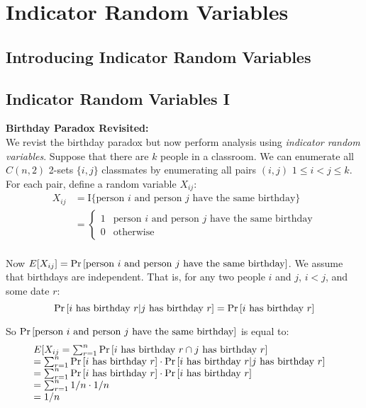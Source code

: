 \chapter{Indicator Random Variables}



\section{Introducing Indicator Random Variables}


\section{Indicator Random Variables I}



\begin{example}
\textbf{Birthday Paradox Revisited:}\\
We revist the birthday paradox but now perform analysis using \textit{indicator random variables}. 
Suppose that there are $k$ people in a classroom. We can enumerate all $C(n,2)$ 2-sets $\{i,j\}$ 
classmates by enumerating all pairs $(i,j)$ $1 \leqslant i < j \leqslant k$. 
For each pair, define a random variable $X_{ij}$:
\[ 
\begin{array}{ll}
 X_{ij} &= \text{I}\{\text{person } i \text{ and person } j \text{ have the same birthday}\}  \\
        &= \left\{  \begin{array}{ll} 1 & \text{person } i \text{ and person } j \text{ have the same birthday}
      \\ 0 & \text{otherwise} \end{array} \\
\end{array}
\]

Now $E[X_{ij}] = \text{Pr}\left[\text{person } i \text{ and person } j \text{ have the same birthday}\right]$. 
We assume that birthdays are independent. That is, for any two people $i$ and $j$, $i < j$, and some date $r$: 
$$\text{Pr}\left[i \text{ has birthday } r | j \text{ has birthday } r\right] = \text{Pr}\left[i \text{ has birthday } r\right]$$ 

So $\text{Pr}\left[\text{person } i \text{ and person } j \text{ have the same birthday}\right]$ is equal to:
\[ 
\begin{array}{ll}
 E[X_{ij}=\sum^{n}_{r=1}\text{Pr}\left[i \text{ has birthday } r \cap j \text{ has birthday } r\right] & \\
 = \sum^{n}_{r=1}\text{Pr}\left[i \text{ has birthday } r\right] \cdot \text{Pr}\left[i \text{ has birthday } r | j \text{ has birthday } r\right] & \\
 = \sum^{n}_{r=1}\text{Pr}\left[i \text{ has birthday } r\right] \cdot \text{Pr}\left[i \text{ has birthday } r\right] &\\
 = \sum^{n}_{r=1} 1/n \cdot 1/n &\\
 = 1/n
\end{array}
\]


\end{example}
